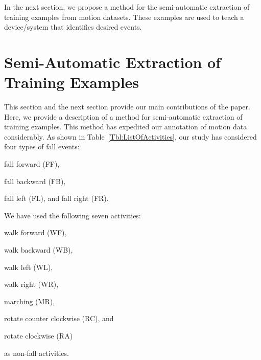 \documentclass[]{IEEEtran}
\begin{document}
\par 

In the next section, we propose a method for the semi-automatic extraction of training examples from motion datasets. These examples are used to teach a device/system that identifies desired events. 

\section{Semi-Automatic Extraction of  Training Examples}
\label{sec:SemiAutomaticExtractionOfTrainingVectors}

This section and the next section provide our main contributions of the paper. Here, we provide a description 
of a method for semi-automatic extraction of training examples. This method has expedited our 
annotation 
of motion data considerably. As shown in Table~\ref{Tbl:ListOfActivities},  our study has considered four types of fall events: 
\begin{inparaenum}[1)] \item fall forward ({\sf FF}), \item fall backward ({\sf FB}), 
\item fall left ({\sf FL}), and fall right ({\sf FR}). \end{inparaenum} We have used the 
following seven activities:\begin{inparaenum}[1)] \item walk forward ({\sf WF}), \item 
walk backward ({\sf WB}), \item walk left ({\sf WL}), \item walk right ({\sf WR}), \item 
marching ({\sf MR}), \item rotate counter clockwise ({\sf RC}), and \item rotate 
clockwise ({\sf RA})  \end{inparaenum} as non-fall activities. 
\end{document}

